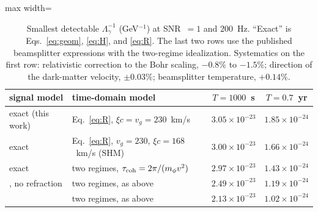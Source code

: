 \begin{table}[t]
\centering
\caption{Smallest detectable $\Lambda_\gamma^{-1}$ (GeV$^{-1}$) at SNR~$=1$ and $200$~Hz. ``Exact'' is Eqs.~\eqref{eq:geom}, \eqref{eq:H}, and \eqref{eq:R}. The last two rows use the published beamsplitter expressions with the two-regime idealization. Systematics on the first row: relativistic correction to the Bohr scaling, $-0.8\%$ to $-1.5\%$; direction of the dark-matter velocity, $\pm0.03\%$; beamsplitter temperature, $+0.14\%$.}
\label{tab:results}
\small
\begin{adjustbox}{max width=\linewidth}
\begin{tabular}{llcc}
\toprule
signal model & time-domain model & $T=1000$~s & $T=0.7$~yr \\
\midrule
exact (this work) & Eq.~\eqref{eq:R}, $\xi c=v_g=230$~km/s & $3.05\times10^{-23}$ & $1.85\times10^{-24}$ \\
exact & Eq.~\eqref{eq:R}, $v_g=230$, $\xi c=168$~km/s (SHM) & $3.00\times10^{-23}$ & $1.66\times10^{-24}$ \\
exact & two regimes, $\tau_{\rm coh}=2\pi/(m_\phi v^2)$ & $2.97\times10^{-23}$ & $1.43\times10^{-24}$ \\
\citet[Eq.~5]{Vermeulen2021}, no refraction & two regimes, as above & $2.49\times10^{-23}$ & $1.19\times10^{-24}$ \\
\citet[Eq.~18]{GroteStadnik2019} & two regimes, as above & $2.13\times10^{-23}$ & $1.02\times10^{-24}$ \\
\bottomrule
\end{tabular}
\end{adjustbox}
\end{table}

